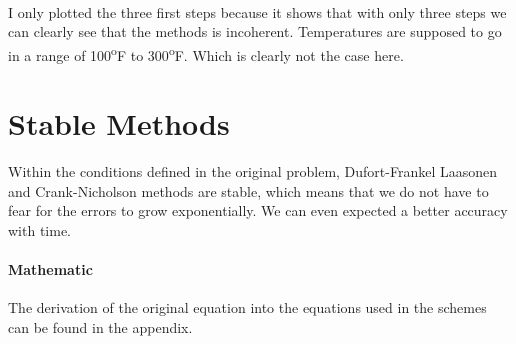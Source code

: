 \documentclass[12pt, a4paper]{report}
\begin{document}
\paragraph{}
I only plotted the three first steps because it shows that with only three steps we can clearly see that the methods is incoherent. Temperatures are supposed to go in a range of 100\textsuperscript{o}F to 300\textsuperscript{o}F. Which is clearly not the case here.

\section{Stable Methods}
Within the conditions defined in the original problem, Dufort-Frankel Laasonen and Crank-Nicholson methods are stable, which means that we do not have to fear for the errors to grow exponentially. We can even expected a better accuracy with time.
\paragraph{Mathematic} The derivation of the original equation into the equations used in the schemes can be found in the appendix.
\end{document}
